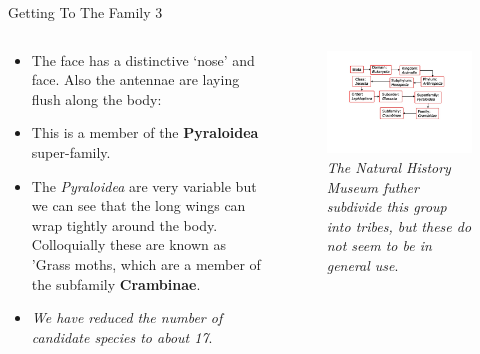 \documentclass[
  ignorenonframetext,
]{beamer}
\providecommand{\tightlist}{%
  \setlength{\itemsep}{0pt}\setlength{\parskip}{0pt}}
\begin{document}
\begin{frame}{Getting To The Family 3}
\protect\hypertarget{getting-to-the-family-3}{}
\begin{columns}[T]
\begin{column}{0.5\textwidth}
\begin{itemize}
\tightlist
\item
  The face has a distinctive `nose' and face. Also the antennae are
  laying flush along the body:
\item
  This is a member of the \textbf{Pyraloidea} super-family.
\item
  The \emph{Pyraloidea} are very variable but we can see that the long
  wings can wrap tightly around the body. Colloquially these are known
  as 'Grass moths, which are a member of the subfamily
  \textbf{Crambinae}.
\item
  \emph{We have reduced the number of candidate species to about 17}.
\end{itemize}
\end{column}

\begin{column}{0.5\textwidth}
\begin{figure}
\centering
\includegraphics{./images/subfamily.jpg}
\caption{\emph{The Natural History Museum futher subdivide this group
into tribes, but these do not seem to be in general use}.}
\end{figure}
\end{column}
\end{columns}
\end{frame}
\end{document}
